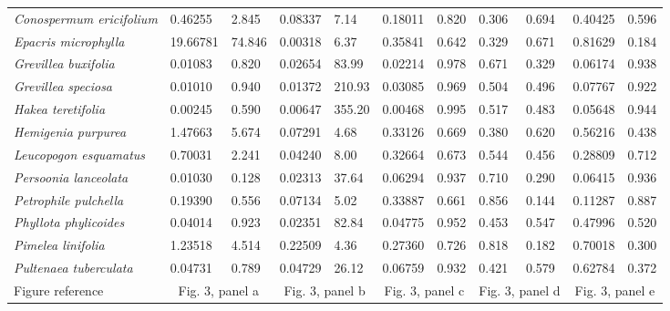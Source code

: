 \documentclass[10pt,twoside]{article}\usepackage[]{graphicx}\usepackage[]{color}
\begin{document}
\begin{table}[h]
{\begin{tabular}{p{3cm}|p{1cm}p{1cm}|p{1cm}p{1cm}|p{1cm}p{1cm}|p{1cm}p{1cm}|p{1.5cm}p{1cm}}
  \textit{Conospermum ericifolium} &  0.46255 &  2.845 & 0.08337 &   7.14 & 0.18011 & 0.820 & 0.306 & 0.694 & 0.40425 & 0.596 \\ 
  \textit{Epacris microphylla} & 19.66781 & 74.846 & 0.00318 &   6.37 & 0.35841 & 0.642 & 0.329 & 0.671 & 0.81629 & 0.184 \\ 
  \textit{Grevillea buxifolia} &  0.01083 &  0.820 & 0.02654 &  83.99 & 0.02214 & 0.978 & 0.671 & 0.329 & 0.06174 & 0.938 \\ 
  \textit{Grevillea speciosa} &  0.01010 &  0.940 & 0.01372 & 210.93 & 0.03085 & 0.969 & 0.504 & 0.496 & 0.07767 & 0.922 \\ 
  \textit{Hakea teretifolia} &  0.00245 &  0.590 & 0.00647 & 355.20 & 0.00468 & 0.995 & 0.517 & 0.483 & 0.05648 & 0.944 \\ 
  \textit{Hemigenia purpurea} &  1.47663 &  5.674 & 0.07291 &   4.68 & 0.33126 & 0.669 & 0.380 & 0.620 & 0.56216 & 0.438 \\ 
  \textit{Leucopogon esquamatus} &  0.70031 &  2.241 & 0.04240 &   8.00 & 0.32664 & 0.673 & 0.544 & 0.456 & 0.28809 & 0.712 \\ 
  \textit{Persoonia lanceolata} &  0.01030 &  0.128 & 0.02313 &  37.64 & 0.06294 & 0.937 & 0.710 & 0.290 & 0.06415 & 0.936 \\ 
  \textit{Petrophile pulchella} &  0.19390 &  0.556 & 0.07134 &   5.02 & 0.33887 & 0.661 & 0.856 & 0.144 & 0.11287 & 0.887 \\ 
  \textit{Phyllota phylicoides} &  0.04014 &  0.923 & 0.02351 &  82.84 & 0.04775 & 0.952 & 0.453 & 0.547 & 0.47996 & 0.520 \\ 
  \textit{Pimelea linifolia} &  1.23518 &  4.514 & 0.22509 &   4.36 & 0.27360 & 0.726 & 0.818 & 0.182 & 0.70018 & 0.300 \\ 
  \textit{Pultenaea tuberculata} &  0.04731 &  0.789 & 0.04729 &  26.12 & 0.06759 & 0.932 & 0.421 & 0.579 & 0.62784 & 0.372 \\ 
   \hline
Figure reference & \multicolumn{2}{c|}{Fig. 3, panel a} & \multicolumn{2}{c|}{Fig. 3, panel b} & \multicolumn{2}{c|}{Fig. 3, panel c} & \multicolumn{2}{c|}{Fig. 3, panel d}  & \multicolumn{2}{c}{Fig. 3, panel e}\\
\hline
\end{tabular}
}
\end{table}

\clearpage
\end{document}
